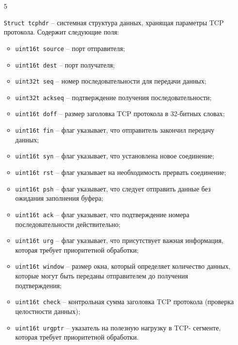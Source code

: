\begin{enumerate}
    \item[5] {{\texttt{Struct tcphdr}} -- системная структура данных, хранящая параметры TCP
    протокола. Содержит следующие поля:
        \begin{itemize}
            \item \texttt{u{\textunderscore}int16{\textunderscore}t source} -- порт отправителя;
            \item \texttt{u{\textunderscore}int16{\textunderscore}t dest} -- порт получателя;
            \item \texttt{u{\textunderscore}int32{\textunderscore}t seq} -- номер последовательности для передачи данных;
            \item \texttt{u{\textunderscore}int32{\textunderscore}t ack{\textunderscore}seq} -- подтверждение получения
            последовательности;
            \item \texttt{u{\textunderscore}int16{\textunderscore}t doff} -- размер заголовка TCP протокола в 32-битных
            словах\cite{unix_prof};
            \item \texttt{u{\textunderscore}int16{\textunderscore}t fin} -- флаг указывает, что отправитель закончил
            передачу данных;
            \item \texttt{u{\textunderscore}int16{\textunderscore}t syn} -- флаг указывает, что установлена новое
            соединение;
            \item \texttt{u{\textunderscore}int16{\textunderscore}t rst} -- флаг указывает на необходимость прервать
            соединение;
            \item \texttt{u{\textunderscore}int16{\textunderscore}t psh} -- флаг указывает, что следует отправить данные
            без ожидания заполнения буфера;
            \item \texttt{u{\textunderscore}int16{\textunderscore}t ack} -- флаг указывает, что подтверждение номера
            последовательности действительно;
            \item \texttt{u{\textunderscore}int16{\textunderscore}t urg} -- флаг указывает, что присутствует важная
            информация, которая требует приоритетной обработки;
            \item \texttt{u{\textunderscore}int16{\textunderscore}t window} -- размер окна, который определяет количество
            данных, которые могут быть переданы отправителем до получения
            подтверждения;
            \item \texttt{u{\textunderscore}int16{\textunderscore}t check} -- контрольная сумма заголовка TCP протокола
            (проверка целостности данных);
            \item \texttt{u{\textunderscore}int16{\textunderscore}t urg{\textunderscore}ptr} -- указатель на полезную нагрузку в TCP-
            сегменте, которая требует приоритетной обработки.
        \end{itemize}}


\end{enumerate}
